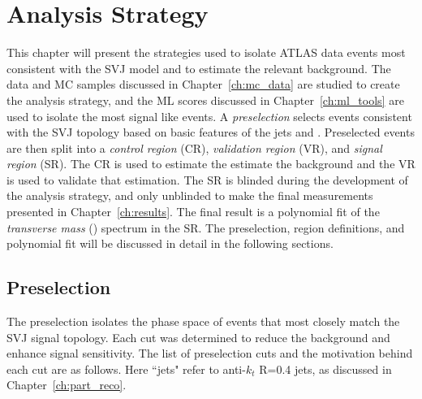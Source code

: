 \chapter{Analysis Strategy}
\label{ch:analysis}

This chapter will present the strategies used to isolate ATLAS data events most consistent with the SVJ model and to estimate the relevant background. The data and MC samples discussed in Chapter~\ref{ch:mc_data} are studied to create the analysis strategy, and the ML scores discussed in Chapter~\ref{ch:ml_tools} are used to isolate the most signal like events. A \textit{preselection} selects events consistent with the SVJ topology based on basic features of the jets and \met. Preselected events are then split into a \textit{control region} (CR), \textit{validation region} (VR), and \textit{signal region} (SR). The CR is used to estimate the estimate the background and the VR is used to validate that estimation. The SR is blinded during the development of the analysis strategy, and only unblinded to make the final measurements presented in Chapter~\ref{ch:results}. The final result is a polynomial fit of the \textit{transverse mass} (\mt) spectrum in the SR. The preselection, region definitions, and polynomial fit will be discussed in detail in the following sections.

\section{Preselection}
\label{sec:eventsel}

The preselection isolates the phase space of events that most closely match the SVJ signal topology. Each cut was determined to reduce the background and enhance signal sensitivity.
The list of preselection cuts and the motivation behind each cut are as follows. 
Here ``jets" refer to anti-$k_t$ R=0.4 jets, as discussed in Chapter~\ref{ch:part_reco}.


